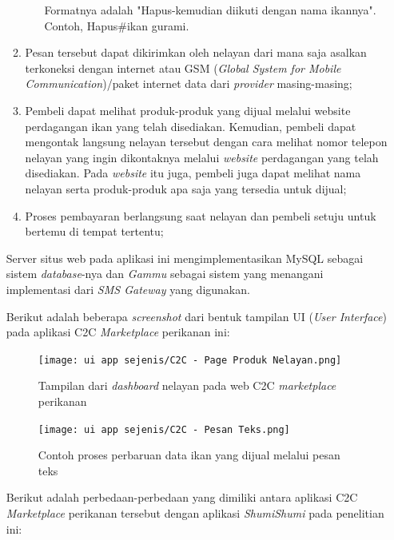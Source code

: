 \documentclass[a4paper]{article}
\begin{document}
\begin{enumerate}
\begin{enumerate}
\begin{itemize}
            Formatnya adalah "Hapus-kemudian diikuti dengan nama ikannya". Contoh, Hapus\#ikan gurami.
        \end{itemize}

        \item Pesan tersebut dapat dikirimkan oleh nelayan dari mana saja asalkan terkoneksi dengan internet atau GSM (\textit{Global System for Mobile Communication})/paket internet data dari \textit{provider} masing-masing\autocite{c2c-fish-marketplace};
        \item Pembeli dapat melihat produk-produk yang dijual melalui website perdagangan ikan yang telah disediakan. Kemudian, pembeli dapat mengontak langsung nelayan tersebut dengan cara melihat nomor telepon nelayan yang ingin dikontaknya melalui \textit{website} perdagangan yang telah disediakan. Pada \textit{website} itu juga, pembeli juga dapat melihat nama nelayan serta produk-produk apa saja yang tersedia untuk dijual\autocite{c2c-fish-marketplace};
        \item Proses pembayaran berlangsung saat nelayan dan pembeli setuju untuk bertemu di tempat tertentu\autocite{c2c-fish-marketplace};

    \end{enumerate}

    Server situs web pada aplikasi ini mengimplementasikan MySQL sebagai sistem \textit{database}-nya dan \textit{Gammu} sebagai sistem yang menangani implementasi dari \textit{SMS Gateway} yang digunakan\autocite{c2c-fish-marketplace}.


    Berikut adalah beberapa \textit{screenshot} dari bentuk tampilan UI (\textit{User Interface}) pada aplikasi C2C \textit{Marketplace} perikanan ini:

    \begin{figure}[h]
        \centering
        \texttt{[image: ui app sejenis/C2C - Page Produk Nelayan.png]}
        \caption{Tampilan dari \textit{dashboard} nelayan pada web C2C \textit{marketplace} perikanan}
    \end{figure}

    \begin{figure}[h]
        \centering
        \texttt{[image: ui app sejenis/C2C - Pesan Teks.png]}
        \caption{Contoh proses perbaruan data ikan yang dijual melalui pesan teks}
    \end{figure}

    Berikut adalah perbedaan-perbedaan yang dimiliki antara aplikasi C2C \textit{Marketplace} perikanan tersebut dengan aplikasi \textit{ShumiShumi} pada penelitian ini:


\end{enumerate}
\end{document}
